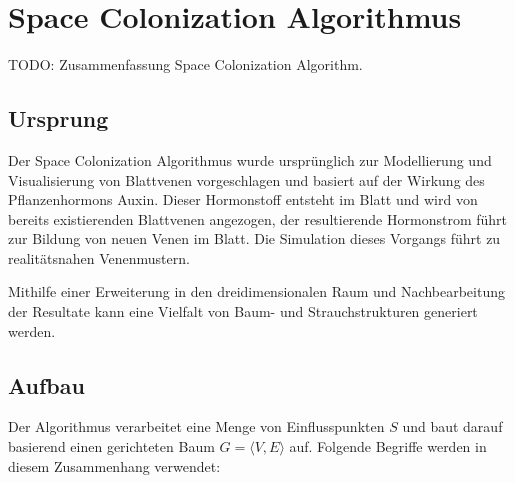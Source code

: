 \chapter{Space Colonization Algorithmus}

TODO: Zusammenfassung Space Colonization Algorithm.

\section{Ursprung}
Der Space Colonization Algorithmus wurde ursprünglich zur Modellierung und Visualisierung von Blattvenen vorgeschlagen und basiert auf der Wirkung des Pflanzenhormons Auxin. Dieser Hormonstoff entsteht im Blatt und wird von bereits existierenden Blattvenen angezogen, der resultierende Hormonstrom führt zur Bildung von neuen Venen im Blatt. Die Simulation dieses Vorgangs führt zu realitätsnahen Venenmustern. \cite[Abschn. 2.5]{LeafVenation:05}

Mithilfe einer Erweiterung in den dreidimensionalen Raum und Nachbearbeitung der Resultate kann eine Vielfalt von Baum- und Strauchstrukturen generiert werden. \cite[Abschn. 1]{SpaceColonizationAlgorithm:07}

\section{Aufbau}

Der Algorithmus verarbeitet eine Menge von Einflusspunkten $S$ und baut darauf basierend einen gerichteten Baum $G = \langle V,E\rangle$ auf. Folgende Begriffe werden in diesem Zusammenhang verwendet: 

